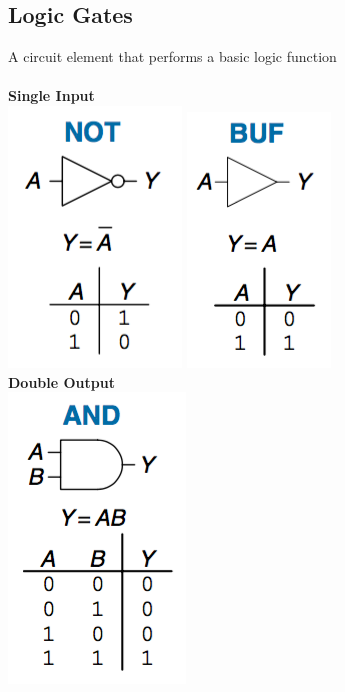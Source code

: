 \documentclass[12pt]{article}
\theoremstyle{definition}
\begin{document}
  \subsection{Logic Gates}
  A circuit element that performs a basic logic function \\ \\
  \textbf{Single Input} \\
  \includegraphics[scale=0.7]{pictures/notGate.png}
  \includegraphics[scale=0.7]{pictures/bufGate.png} \\
  \textbf{Double Output} \\
  \includegraphics[scale=0.7]{pictures/andGate.png}
\end{document}
